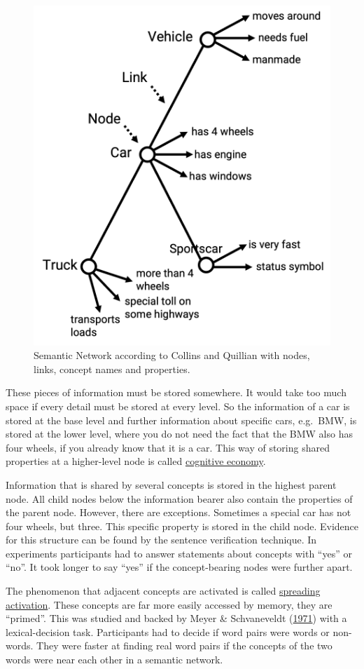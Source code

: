 \documentclass[
]{krantz}
\begin{document}
\begin{figure}

{\centering \includegraphics[width=0.6\linewidth]{images/ch7/fig5} 

}

\caption{Semantic Network according to Collins and Quillian with nodes, links, concept names and properties. }\label{fig:network}
\end{figure}

These pieces of information must be stored somewhere. It would take too much space if every detail must be stored at every level. So the information of a car is stored at the base level and further information about specific cars, e.g.~BMW, is stored at the lower level, where you do not need the fact that the BMW also has four wheels, if you already know that it is a car. This way of storing shared properties at a higher-level node is called \protect\hyperlink{cognitive-economy}{cognitive economy}.

Information that is shared by several concepts is stored in the highest parent node. All child nodes below the information bearer also contain the properties of the parent node. However, there are exceptions. Sometimes a special car has not four wheels, but three. This specific property is stored in the child node. Evidence for this structure can be found by the sentence verification technique. In experiments participants had to answer statements about concepts with ``yes'' or ``no''. It took longer to say ``yes'' if the concept-bearing nodes were further apart.

The phenomenon that adjacent concepts are activated is called \protect\hyperlink{spreading-activation}{spreading activation}. These concepts are far more easily accessed by memory, they are ``primed''. This was studied and backed by Meyer \& Schvaneveldt (\protect\hyperlink{ref-meyer1971facilitation}{1971}) with a lexical-decision task. Participants had to decide if word pairs were words or non-words. They were faster at finding real word pairs if the concepts of the two words were near each other in a semantic network.
\end{document}
